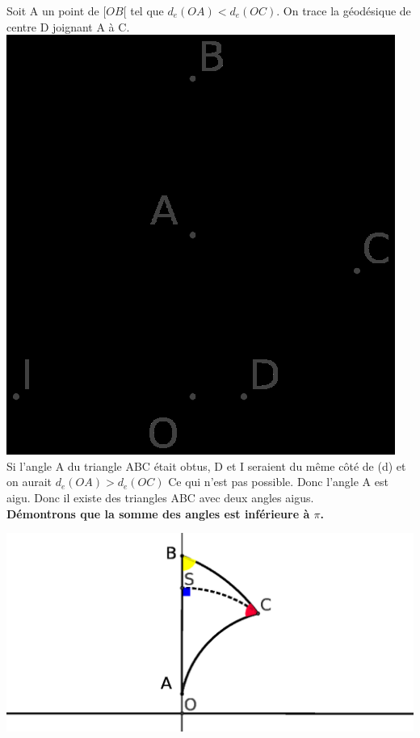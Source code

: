 \documentclass[a4paper, 12pt, twoside]{book}
\begin{document}
 
 

 
 Soit A un point de $[OB[$ tel que $d_{e}(OA)<d_{e}(OC)$. On trace la géodésique de centre D joignant A à C. \\
 
 
 
  \includegraphics[scale=0.5]{figures/hyper12.eps} \\
  
  
  Si l'angle A du triangle ABC était obtus, D et I seraient du même côté de (d) et on aurait  $d_{e}(OA)>d_{e}(OC)$ Ce qui n'est pas possible. Donc l'angle A est aigu. Donc il existe des triangles ABC avec deux angles aigus.\\
  
\textbf{Démontrons que la somme des angles est inférieure à $\pi$.}  
  
  \includegraphics[scale=0.7]{figures/Hyper9.eps} \\
  
\end{document}
